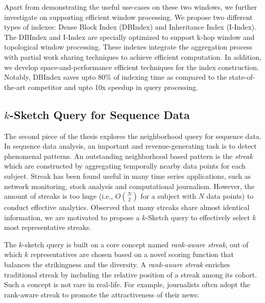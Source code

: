 Apart from demonstrating the useful use-cases on these two windows, 
we further investigate on supporting efficient window processing.  We propose
two different types of indexes: Dense Block Index (DBIndex)
and Inheritance Index (I-Index). The DBIndex and I-Index
are specially optimized to support k-hop window and topological
window processing. These indexes
integrate the aggregation process with partial work sharing techniques
to achieve efficient computation.
In addition, we develop space-and-performance efficient techniques
for the index construction. Notably, DBIndex saves upto 80\%
of indexing time as compared to the state-of-the-art competitor and upto 10x
speedup in query processing. 


\subsection{$k$-Sketch Query for Sequence Data}
The second piece of the thesis explores the neighborhood
query for sequence data. 
In sequence data analysis, an important
and revenue-generating task is to detect phenomenal patterns.
An outstanding neighborhood based pattern is the \emph{streak} which are constructed by aggregating
temporally nearby data points for each subject.
%
%
%
%
%
Streak has been found useful in many time series applications,
such as network monitoring, stock analysis
and computational journalism. 
However, the amount of streaks
is too huge (i.e., $O{N \choose 2}$ for a subject with $N$ data points) 
to conduct effective analytics. Observed that
many streaks share almost identical information, we are motivated 
to propose a $k$-Sketch
query to effectively select $k$ most representative streaks.

The $k$-sketch query is built on a core concept named \emph{rank-aware streak},
out of which $k$ representatives are 
chosen based on a novel scoring function
that balances the strikingness and the diversity. A \emph{rank-aware streak}
enriches traditional streak by including the
relative position of a streak among its cohort.
Such a concept is not rare in real-life.
For example, journalists often adopt the rank-aware streak to promote
the attractiveness of their news:


